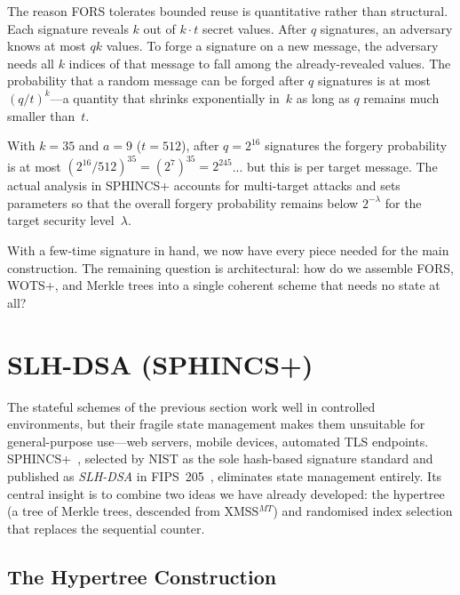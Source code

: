 The reason FORS tolerates bounded reuse is quantitative rather than structural.  Each signature reveals $k$ out of $k \cdot t$ secret values.  After $q$ signatures, an adversary knows at most $qk$ values.  To forge a signature on a new message, the adversary needs all $k$ indices of that message to fall among the already-revealed values.  The probability that a random message can be forged after $q$ signatures is at most $(q/t)^k$---a quantity that shrinks exponentially in~$k$ as long as $q$ remains much smaller than~$t$.

\begin{example}
\label{ex:fors-forgery}
With $k = 35$ and $a = 9$ ($t = 512$), after $q = 2^{16}$ signatures the forgery probability is at most $(2^{16}/512)^{35} = (2^7)^{35} = 2^{245}$... but this is per target message.  The actual analysis in SPHINCS+ accounts for multi-target attacks and sets parameters so that the overall forgery probability remains below $2^{-\lambda}$ for the target security level~$\lambda$.
\end{example}

With a few-time signature in hand, we now have every piece needed for the main construction.  The remaining question is architectural: how do we assemble FORS, WOTS+, and Merkle trees into a single coherent scheme that needs no state at all?


\section{SLH-DSA (SPHINCS+)}
\label{sec:slh-dsa}

The stateful schemes of the previous section work well in controlled environments, but their fragile state management makes them unsuitable for general-purpose use---web servers, mobile devices, automated TLS endpoints.  SPHINCS+~\cite{SPHINCS2015, BHHplus2015}, selected by NIST as the sole hash-based signature standard and published as \emph{SLH-DSA} in FIPS~205~\cite{FIPS205}, eliminates state management entirely.  Its central insight is to combine two ideas we have already developed: the hypertree (a tree of Merkle trees, descended from XMSS$^{MT}$) and randomised index selection that replaces the sequential counter.

\subsection{The Hypertree Construction}
\label{subsec:hypertree}


